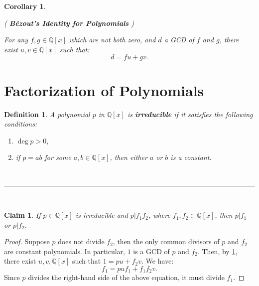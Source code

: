 \documentclass[a4paper,12pt]{report}
\newcounter{statement}
\numberwithin{statement}{chapter}
\newtheorem{defn}[statement]{Definition}
\newtheorem{claim}[statement]{Claim}
\newtheorem{cor}[statement]{Corollary}
\numberwithin{equation}{chapter}
\numberwithin{section}{chapter}
\numberwithin{subsection}{section}
\begin{document}
\begin{cor}
\label{bezoutpolynomial}


( {\bf Bézout's Identity for Polynomials} )



For any $f, g \in \mathbb{Q}[x]$ which are not both zero,
and $d$ a GCD of $f$ and $g$,
there exist $u, v \in \mathbb{Q}[x]$ such that:
\[
d = fu + gv.
\]
\end{cor}

\section{Factorization of Polynomials}

\begin{defn}
A polynomial $p$ in $\mathbb{Q}[x]$ is  {\bf irreducible} 
if it satisfies the following conditions:
\begin{enumerate}
\item  $\deg p > 0$,

\item  if $p = ab$ for some $a, b \in \mathbb{Q}[x]$, then either $a$ or $b$
is a constant.
\end{enumerate}
\end{defn}

\quad\\\hrule
\quad\\

\begin{claim}

If $p \in \mathbb{Q}[x]$ is irreducible and $p | f_1f_2$, where $f_1, f_2 \in \mathbb{Q}[x]$,
then $p | f_1$ or $p | f_2$.
\end{claim}
\begin{proof}

Suppose $p$ does not divide $f_2$, then the only common divisors of $p$ and $f_2$ are
constant polynomials.
In particular, $1$ is a GCD of $p$ and $f_2$.  Then, by \cref{bezoutpolynomial},
there exist $u, v, \mathbb{Q}[x]$ such that $1 = pu + f_2v$.  We have:
\[
f_1 = puf_1 + f_1f_2v.
\]
Since $p$ divides the right-hand side of the above equation, it must divide $f_1$.


\end{proof}
\end{document}
